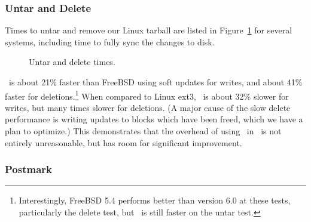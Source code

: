 \subsubsection{Untar and Delete}
\label{sec:eval:untardel}

Times to untar and remove our Linux tarball are listed in
Figure~\ref{fig:macro} for several systems, including time to fully sync
the changes to disk.

\begin{figure}[t]
\caption{\label{fig:macro} Untar and delete times.}
\end{figure}

\Kudos\ is about 21\% faster than FreeBSD using soft updates for
writes, and about 41\% faster for deletions.\footnote{Interestingly, FreeBSD 5.4
performs better than version 6.0 at these tests, particularly the delete test,
but \Kudos\ is still faster on the untar test.}
%
When compared to Linux ext3, \Kudos\ is about 32\% slower for writes, but many
times slower for deletions.
(A major cause of the slow delete performance is writing
updates to blocks which have been freed, which we have a plan to optimize.)
%
This demonstrates that the overhead of using \chdescs\ in \Kudos\ is not
entirely unreasonable, but has room for significant improvement.
%
%

\subsubsection {Postmark}
\label{sec:eval:postmark}

